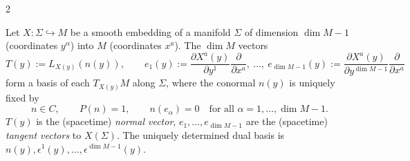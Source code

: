 \begin{paracol}{2}
\begin{definition}\label{def:c29-embed}
Let $X:\Sigma\hookrightarrow M$ be a smooth embedding of a manifold $\Sigma$ of dimension $\dim M-1$ (coordinates $y^\alpha$) into $M$ (coordinates $x^a$). The $\dim M$ vectors
\[
  T(y):=L_{X(y)}(n(y)),\qquad e_1(y):=\frac{\partial X^a(y)}{\partial y^1}\frac\partial{\partial x^a},\ \dots,\ e_{\dim M-1}(y):=\frac{\partial X^a(y)}{\partial y^{\dim M-1}}\frac\partial{\partial x^a}
\]
form a basis of each $T_{X(y)}M$ along $\Sigma$, where the conormal $n(y)$ is uniquely fixed by
\[
  n\in C,\qquad P(n)=1,\qquad n(e_\alpha)=0\quad\text{for all }\alpha=1,\dots,\dim M-1.
\]
$T(y)$ is the (spacetime) \emph{normal vector}, $e_1,\dots,e_{\dim M-1}$ are the (spacetime) \emph{tangent vectors} to $X(\Sigma)$. The uniquely determined dual basis is $n(y),\epsilon^1(y),\dots,\epsilon^{\dim M-1}(y)$.
\end{definition}


\end{paracol}
